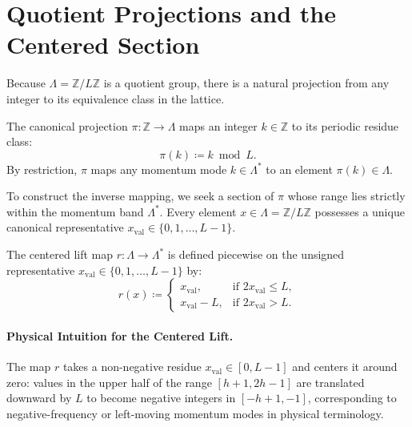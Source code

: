 \section{Quotient Projections and the Centered Section}

Because $\Lambda = \mathbb{Z}/L\mathbb{Z}$ is a quotient group, there is a natural projection from any integer to its equivalence class in the lattice.

\begin{definition}
The canonical projection $\pi : \mathbb{Z} \to \Lambda$ maps an integer $k \in \mathbb{Z}$ to its periodic residue class:
\begin{equation}
\pi(k) \coloneqq k \bmod L.
\end{equation}
By restriction, $\pi$ maps any momentum mode $k \in \Lambda^*$ to an element $\pi(k) \in \Lambda$.
\end{definition}

To construct the inverse mapping, we seek a section of $\pi$ whose range lies strictly within the momentum band $\Lambda^*$. Every element $x \in \Lambda = \mathbb{Z}/L\mathbb{Z}$ possesses a unique canonical representative $x_{\mathrm{val}} \in \{0, 1, \dots, L-1\}$.

\begin{definition}
The centered lift map $r : \Lambda \to \Lambda^*$ is defined piecewise on the unsigned representative $x_{\mathrm{val}} \in \{0, 1, \dots, L-1\}$ by:
\begin{equation}
r(x) \coloneqq \begin{cases}
x_{\mathrm{val}}, & \text{if } 2 x_{\mathrm{val}} \le L, \\
x_{\mathrm{val}} - L, & \text{if } 2 x_{\mathrm{val}} > L.
\end{cases}
\end{equation}
\end{definition}

\paragraph{Physical Intuition for the Centered Lift.}
The map $r$ takes a non-negative residue $x_{\mathrm{val}} \in [0, L-1]$ and centers it around zero: values in the upper half of the range $[h+1, 2h-1]$ are translated downward by $L$ to become negative integers in $[-h+1, -1]$, corresponding to negative-frequency or left-moving momentum modes in physical terminology.

